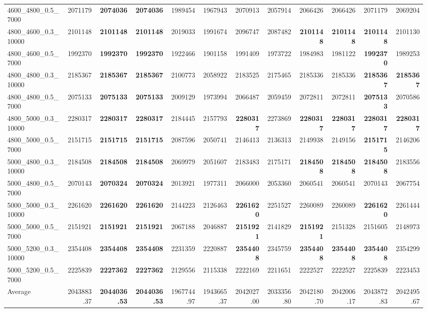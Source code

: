 \begin{landscape}
\begin{longtable}{lrrrrrrrrrrr}
4600\_4800\_0.5\_7000 & 2071179 & \textbf{2074036} & \textbf{2074036} & 1989454 & 1967943 & 2070913 & 2057914 & 2066426 & 2066426 & 2071179 & 2069204\\
4800\_4600\_0.3\_10000 & 2101148 & \textbf{2101148} & \textbf{2101148} & 2019033 & 1991674 & 2096747 & 2087482 & \textbf{2101148} & \textbf{2101148} & \textbf{2101148} & 2101130\\
4800\_4600\_0.5\_7000 & 1992370 & \textbf{1992370} & \textbf{1992370} & 1922466 & 1901158 & 1991409 & 1973722 & 1984983 & 1981122 & \textbf{1992370} & 1989253\\
4800\_4800\_0.3\_10000 & 2185367 & \textbf{2185367} & \textbf{2185367} & 2100773 & 2058922 & 2183525 & 2175465 & 2185336 & 2185336 & \textbf{2185367} & \textbf{2185367}\\
4800\_4800\_0.5\_7000 & 2075133 & \textbf{2075133} & \textbf{2075133} & 2009129 & 1973994 & 2066487 & 2059459 & 2072811 & 2072811 & \textbf{2075133} & 2070586\\
4800\_5000\_0.3\_10000 & 2280317 & \textbf{2280317} & \textbf{2280317} & 2184445 & 2157793 & \textbf{2280317} & 2273869 & \textbf{2280317} & \textbf{2280317} & \textbf{2280317} & \textbf{2280317}\\
4800\_5000\_0.5\_7000 & 2151715 & \textbf{2151715} & \textbf{2151715} & 2087596 & 2050741 & 2146413 & 2136313 & 2149938 & 2149156 & \textbf{2151715} & 2146206\\
5000\_4800\_0.3\_10000 & 2184508 & \textbf{2184508} & \textbf{2184508} & 2069979 & 2051607 & 2183483 & 2175171 & \textbf{2184508} & \textbf{2184508} & \textbf{2184508} & 2183556\\
5000\_4800\_0.5\_7000 & 2070143 & \textbf{2070324} & \textbf{2070324} & 2013921 & 1977311 & 2066000 & 2053360 & 2060541 & 2060541 & 2070143 & 2067754\\
5000\_5000\_0.3\_10000 & 2261620 & \textbf{2261620} & \textbf{2261620} & 2144223 & 2126463 & \textbf{2261620} & 2251527 & 2260089 & 2260089 & \textbf{2261620} & 2261444\\
5000\_5000\_0.5\_7000 & 2151921 & \textbf{2151921} & \textbf{2151921} & 2067188 & 2046887 & \textbf{2151921} & 2141829 & \textbf{2151921} & 2151328 & 2151605 & 2148973\\
5000\_5200\_0.3\_10000 & 2354408 & \textbf{2354408} & \textbf{2354408} & 2231359 & 2220887 & \textbf{2354408} & 2345759 & \textbf{2354408} & \textbf{2354408} & \textbf{2354408} & 2354299\\
5000\_5200\_0.5\_7000 & 2225839 & \textbf{2227362} & \textbf{2227362} & 2129556 & 2115338 & 2222169 & 2211651 & 2222527 & 2222527 & 2225839 & 2223453\\
\midrule
Average & 2043883.37 & \textbf{2044036.53} & \textbf{2044036.53} & 1967744.97 & 1943665.37 & 2042027.00 & 2033356.80 & 2042180.70 & 2042006.17 & 2043872.83 & 2042495.67\\
\end{longtable}\endgroup\clearpage

\end{landscape}
